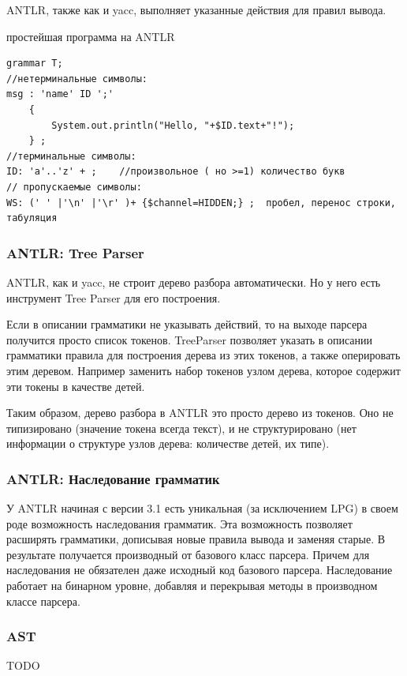 \documentclass[a4paper,12pt]{article}
\begin{document}
ANTLR, также как и yacc, выполняет указанные действия для правил вывода.

\begin{example}
простейшая программа на ANTLR
\end{example}
\begin{verbatim}
grammar T;
//нетерминальные символы:
msg : 'name' ID ';' 
	{
		System.out.println("Hello, "+$ID.text+"!");
	} ;
//терминальные символы:
ID: 'a'..'z' + ;	//произвольное ( но >=1) количество букв
// пропускаемые символы:
WS: (' ' |'\n' |'\r' )+ {$channel=HIDDEN;} ;  пробел, перенос строки, табуляция
\end{verbatim}

\subsubsection{ANTLR: Tree Parser}
ANTLR, как и yacc, не строит дерево разбора автоматически. Но у него есть
инструмент Tree Parser для его построения.

Если в описании грамматики не указывать действий, то на выходе парсера получится
просто список токенов. TreeParser позволяет указать в описании грамматики
правила для построения дерева из этих токенов, а также оперировать этим деревом.
Например заменить набор токенов узлом дерева, которое содержит эти токены в
качестве детей.

Таким образом, дерево разбора в ANTLR это просто дерево из токенов. Оно не
типизировано (значение токена всегда текст), и не структурировано (нет
информации о структуре узлов дерева: количестве детей, их типе).

\subsubsection{ANTLR: Наследование грамматик}
У ANTLR начиная с версии 3.1 есть уникальная (за исключением LPG) в своем роде
возможность наследования грамматик. Эта возможность позволяет расширять
грамматики, дописывая новые правила вывода и заменяя старые. В результате
получается производный от базового класс парсера. Причем для наследования не
обязателен даже исходный код базового парсера. Наследование работает на
бинарном уровне, добавляя и перекрывая методы в производном классе парсера.

\subsubsection{AST}
TODO
\end{document}
